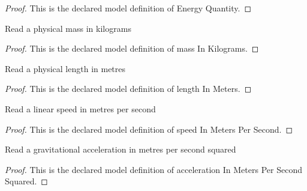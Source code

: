 \begin{proof}
  This is the declared model definition of Energy Quantity.
\end{proof}
\begin{definition}
  \label{def:physics:phyx-mini-0773:phyxminiproblems-problemphyxmini0773-massinkilograms}
  Read a physical mass in kilograms
\end{definition}
\begin{proof}
  This is the declared model definition of mass In Kilograms.
\end{proof}
\begin{definition}
  \label{def:physics:phyx-mini-0773:phyxminiproblems-problemphyxmini0773-lengthinmeters}
  Read a physical length in metres
\end{definition}
\begin{proof}
  This is the declared model definition of length In Meters.
\end{proof}
\begin{definition}
  \label{def:physics:phyx-mini-0773:phyxminiproblems-problemphyxmini0773-speedinmeterspersecond}
  Read a linear speed in metres per second
\end{definition}
\begin{proof}
  This is the declared model definition of speed In Meters Per Second.
\end{proof}
\begin{definition}
  \label{def:physics:phyx-mini-0773:phyxminiproblems-problemphyxmini0773-accelerationinmeterspersecondsquared}
  Read a gravitational acceleration in metres per second squared
\end{definition}
\begin{proof}
  This is the declared model definition of acceleration In Meters Per Second Squared.
\end{proof}
